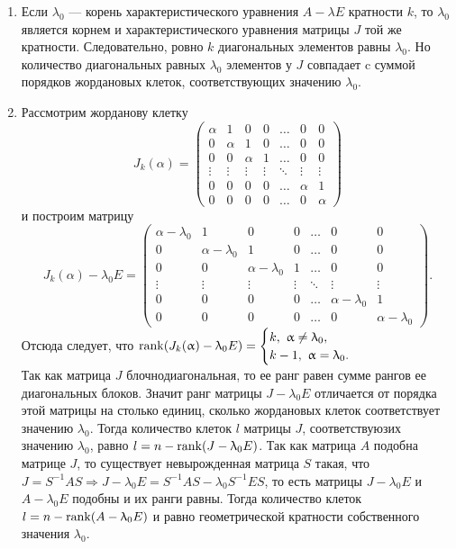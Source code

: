 \begin{Proof}
\begin{enumerate}
		\item Если $\lambda_0$ --- корень характеристического уравнения $A-\lambda E$ кратности $k$, то $\lambda_0$ является корнем и характеристического уравнения матрицы $J$ той же кратности. Следовательно, ровно $k$ диагональных элементов равны $\lambda_0$. Но количество диагональных равных $\lambda_0$ элементов у $J$ совпадает c суммой порядков жордановых клеток, соответствующих значению $\lambda_0$.
		\item Рассмотрим жорданову клетку $$J_k(\alpha) = \begin{pmatrix}
			\alpha & 1 & 0 & 0 & \dots & 0 & 0\\
			0 & \alpha & 1 & 0 & \dots & 0 & 0\\
			0 & 0 & \alpha & 1 & \dots & 0 & 0\\
			\vdots & \vdots & \vdots & \vdots & \ddots & \vdots & \vdots \\
			0 & 0 & 0 & 0 &\dots& \alpha & 1\\
			0 & 0 & 0 & 0 &\dots& 0 & \alpha
		\end{pmatrix}$$ и построим матрицу  $$J_k(\alpha) - \lambda_0 E =
		\begin{pmatrix} \alpha - \lambda_0 & 1 & 0 & 0 & \dots & 0 & 0 \\
			0 & \alpha - \lambda_0 & 1 & 0 & \dots & 0 & 0 \\
			0 & 0 & \alpha - \lambda_0 & 1 & \dots & 0 & 0 \\
			\vdots & \vdots & \vdots & \vdots & \ddots & \vdots & \vdots\\
			0 & 0 & 0 & 0 & \dots & \alpha - \lambda_0 & 1 \\
			0 & 0 & 0 & 0 & \dots & 0 & \alpha - \lambda_0
		\end{pmatrix}.$$
		Отсюда следует, что $\operatorname{rank}  (J_k(\upalpha) - \uplambda_0 E) = \begin{cases}
			k,\ \upalpha \ne \uplambda_0,\\
			k - 1,\ \upalpha = \uplambda_0.
		\end{cases}$\\
		Так как матрица $J$ блочнодиагональная, то ее ранг равен сумме рангов ее диагональных блоков. Значит ранг матрицы $J - \lambda_0 E$ отличается от порядка этой матрицы на столько единиц, сколько жордановых клеток соответствует значению $\lambda_0$. Тогда количество клеток $l$ матрицы $J$, соответствуюзих значению $\lambda_0$, равно $l = n - \operatorname{rank} (J-\uplambda_0 E)$. Так как матрица $A$ подобна матрице $J$, то существует невырожденная матрица $S$ такая, что $J = S^{-1}AS\Rightarrow J - \lambda_0 E = S^{-1}AS - \lambda_0 S^{-1}ES$, то есть матрицы $J-\lambda_0 E$ и $A-\lambda_0 E$ подобны и их ранги равны. Тогда количество клеток $l = n - \operatorname{rank} (A - \uplambda_0 E)$ и равно геометрической кратности собственного значения $\lambda_0$.

\end{enumerate}
\end{Proof}
